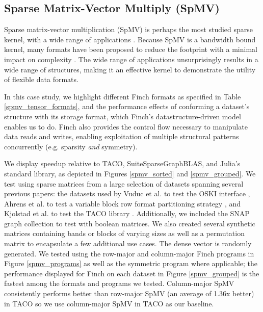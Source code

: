 \subsection{Sparse Matrix-Vector Multiply (SpMV)}
Sparse matrix-vector multiplication (SpMV) is perhaps the most studied sparse
kernel, with a wide range of applications \cite{liu_csr5_2015,
zhou_enabling_2020}. Because SpMV is a bandwidth bound kernel, many formats have
been proposed to reduce the footprint with a minimal impact on complexity
\cite{langr_evaluation_2016}. The wide range of applications unsurprisingly
results in a wide range of structures, making it an effective kernel to
demonstrate the utility of flexible data formats. 

In this case study, we highlight different Finch formats as specified in Table \ref{spmv_tensor_formats}, and the performance effects of conforming a dataset’s structure with its storage format, which Finch's datastructure-driven model enables us to do. Finch also provides the control flow necessary to manipulate data reads and writes, enabling exploitation of multiple structural patterns concurrently (e.g. sparsity \textit{and} symmetry). 

We display speedup relative to TACO, SuiteSparseGraphBLAS, and Julia’s standard library, as depicted in Figures \ref{spmv_sorted} and \ref{spmv_grouped}.  We test using sparse matrices from a large selection of datasets spanning several previous papers: the datasets used by Vuduc et al. to test the OSKI interface \cite{vuduc2005oski}, Ahrens et al. to test a variable block row format partitioning strategy \cite{ahrens_optimal_2021}, and Kjolstad et al. to test the TACO library \cite{kjolstad_tensor_2017}. Additionally, we included the SNAP graph collection to test with boolean matrices. We also created several synthetic matrices containing bands or blocks of varying sizes as well as a permutation matrix to encapsulate a few additional use cases. The dense vector is randomly generated. We tested using the row-major and column-major Finch programs in Figure \ref{spmv_programs} as well as the symmetric program where applicable; the performance displayed for Finch on each dataset in Figure \ref{spmv_grouped} is the fastest among the formats and programs we tested. Column-major SpMV consistently performs better than row-major SpMV (an average of 1.36x better) in TACO so we use column-major SpMV in TACO as our baseline.

